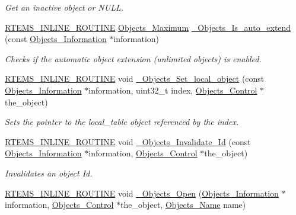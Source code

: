 \begin{DoxyCompactItemize}
\begin{DoxyCompactList}\small\item\em Get an inactive object or N\+U\+LL. \end{DoxyCompactList}\item 
\mbox{\hyperlink{group__RTEMSScoreBaseDefs_gac216239df231d5dbd15e3520b0b9313f}{R\+T\+E\+M\+S\+\_\+\+I\+N\+L\+I\+N\+E\+\_\+\+R\+O\+U\+T\+I\+NE}} \mbox{\hyperlink{group__RTEMSScoreObject_gaa2735357885ec7d7157c32f3f835f9ae}{Objects\+\_\+\+Maximum}} \mbox{\hyperlink{group__RTEMSScoreObject_gaba65e2c96c6fde53bea31b45152fb79d}{\+\_\+\+Objects\+\_\+\+Is\+\_\+auto\+\_\+extend}} (const \mbox{\hyperlink{structObjects__Information}{Objects\+\_\+\+Information}} $\ast$information)
\begin{DoxyCompactList}\small\item\em Checks if the automatic object extension (unlimited objects) is enabled. \end{DoxyCompactList}\item 
\mbox{\hyperlink{group__RTEMSScoreBaseDefs_gac216239df231d5dbd15e3520b0b9313f}{R\+T\+E\+M\+S\+\_\+\+I\+N\+L\+I\+N\+E\+\_\+\+R\+O\+U\+T\+I\+NE}} void \mbox{\hyperlink{group__RTEMSScoreObject_ga9c697fd8a483c32420ccfff211ec3c14}{\+\_\+\+Objects\+\_\+\+Set\+\_\+local\+\_\+object}} (const \mbox{\hyperlink{structObjects__Information}{Objects\+\_\+\+Information}} $\ast$information, uint32\+\_\+t index, \mbox{\hyperlink{structObjects__Control}{Objects\+\_\+\+Control}} $\ast$the\+\_\+object)
\begin{DoxyCompactList}\small\item\em Sets the pointer to the local\+\_\+table object referenced by the index. \end{DoxyCompactList}\item 
\mbox{\hyperlink{group__RTEMSScoreBaseDefs_gac216239df231d5dbd15e3520b0b9313f}{R\+T\+E\+M\+S\+\_\+\+I\+N\+L\+I\+N\+E\+\_\+\+R\+O\+U\+T\+I\+NE}} void \mbox{\hyperlink{group__RTEMSScoreObject_gabcf4e7e43d740a83abd8651c86fc3260}{\+\_\+\+Objects\+\_\+\+Invalidate\+\_\+\+Id}} (const \mbox{\hyperlink{structObjects__Information}{Objects\+\_\+\+Information}} $\ast$information, \mbox{\hyperlink{structObjects__Control}{Objects\+\_\+\+Control}} $\ast$the\+\_\+object)
\begin{DoxyCompactList}\small\item\em Invalidates an object Id. \end{DoxyCompactList}\item 
\mbox{\hyperlink{group__RTEMSScoreBaseDefs_gac216239df231d5dbd15e3520b0b9313f}{R\+T\+E\+M\+S\+\_\+\+I\+N\+L\+I\+N\+E\+\_\+\+R\+O\+U\+T\+I\+NE}} void \mbox{\hyperlink{group__RTEMSScoreObject_ga09c8a97720f6c6dd41849c5c4101e49d}{\+\_\+\+Objects\+\_\+\+Open}} (\mbox{\hyperlink{structObjects__Information}{Objects\+\_\+\+Information}} $\ast$information, \mbox{\hyperlink{structObjects__Control}{Objects\+\_\+\+Control}} $\ast$the\+\_\+object, \mbox{\hyperlink{unionObjects__Name}{Objects\+\_\+\+Name}} name)

\end{DoxyCompactItemize}
